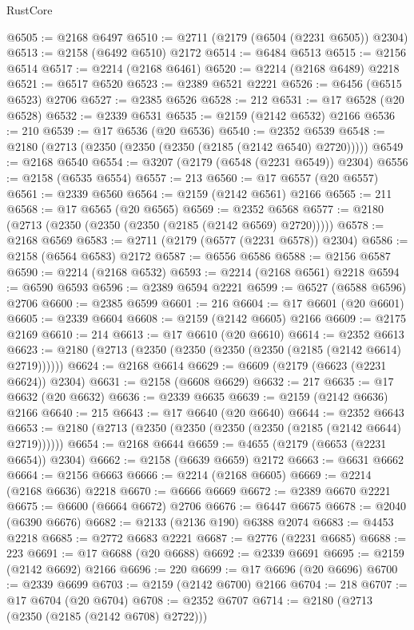 \begin{lexlean}{RustCore}
\begin{coremodule}
@6505 := @2168 @6497
@6510 := @2711 (@2179 (@6504 (@2231 @6505)) @2304)
@6513 := @2158 (@6492 @6510) @2172
@6514 := @6484 @6513
@6515 := @2156 @6514
@6517 := @2214 (@2168 @6461)
@6520 := @2214 (@2168 @6489) @2218
@6521 := @6517 @6520
@6523 := @2389 @6521 @2221
@6526 := @6456 (@6515 @6523) @2706
@6527 := @2385 @6526
@6528 := 212
@6531 := @17 @6528 (@20 @6528)
@6532 := @2339 @6531
@6535 := @2159 (@2142 @6532) @2166
@6536 := 210
@6539 := @17 @6536 (@20 @6536)
@6540 := @2352 @6539
@6548 := @2180 (@2713 (@2350 (@2350 (@2350 (@2185 (@2142 @6540) @2720)))))
@6549 := @2168 @6540
@6554 := @3207 (@2179 (@6548 (@2231 @6549)) @2304)
@6556 := @2158 (@6535 @6554)
@6557 := 213
@6560 := @17 @6557 (@20 @6557)
@6561 := @2339 @6560
@6564 := @2159 (@2142 @6561) @2166
@6565 := 211
@6568 := @17 @6565 (@20 @6565)
@6569 := @2352 @6568
@6577 := @2180 (@2713 (@2350 (@2350 (@2350 (@2185 (@2142 @6569) @2720)))))
@6578 := @2168 @6569
@6583 := @2711 (@2179 (@6577 (@2231 @6578)) @2304)
@6586 := @2158 (@6564 @6583) @2172
@6587 := @6556 @6586
@6588 := @2156 @6587
@6590 := @2214 (@2168 @6532)
@6593 := @2214 (@2168 @6561) @2218
@6594 := @6590 @6593
@6596 := @2389 @6594 @2221
@6599 := @6527 (@6588 @6596) @2706
@6600 := @2385 @6599
@6601 := 216
@6604 := @17 @6601 (@20 @6601)
@6605 := @2339 @6604
@6608 := @2159 (@2142 @6605) @2166
@6609 := @2175 @2169
@6610 := 214
@6613 := @17 @6610 (@20 @6610)
@6614 := @2352 @6613
@6623 := @2180 (@2713 (@2350 (@2350 (@2350 (@2350 (@2185 (@2142 @6614) @2719))))))
@6624 := @2168 @6614
@6629 := @6609 (@2179 (@6623 (@2231 @6624)) @2304)
@6631 := @2158 (@6608 @6629)
@6632 := 217
@6635 := @17 @6632 (@20 @6632)
@6636 := @2339 @6635
@6639 := @2159 (@2142 @6636) @2166
@6640 := 215
@6643 := @17 @6640 (@20 @6640)
@6644 := @2352 @6643
@6653 := @2180 (@2713 (@2350 (@2350 (@2350 (@2350 (@2185 (@2142 @6644) @2719))))))
@6654 := @2168 @6644
@6659 := @4655 (@2179 (@6653 (@2231 @6654)) @2304)
@6662 := @2158 (@6639 @6659) @2172
@6663 := @6631 @6662
@6664 := @2156 @6663
@6666 := @2214 (@2168 @6605)
@6669 := @2214 (@2168 @6636) @2218
@6670 := @6666 @6669
@6672 := @2389 @6670 @2221
@6675 := @6600 (@6664 @6672) @2706
@6676 := @6447 @6675
@6678 := @2040 (@6390 @6676)
@6682 := @2133 (@2136 @190) @6388 @2074
@6683 := @4453 @2218
@6685 := @2772 @6683 @2221
@6687 := @2776 (@2231 @6685)
@6688 := 223
@6691 := @17 @6688 (@20 @6688)
@6692 := @2339 @6691
@6695 := @2159 (@2142 @6692) @2166
@6696 := 220
@6699 := @17 @6696 (@20 @6696)
@6700 := @2339 @6699
@6703 := @2159 (@2142 @6700) @2166
@6704 := 218
@6707 := @17 @6704 (@20 @6704)
@6708 := @2352 @6707
@6714 := @2180 (@2713 (@2350 (@2185 (@2142 @6708) @2722)))

\end{coremodule}
\end{lexlean}
